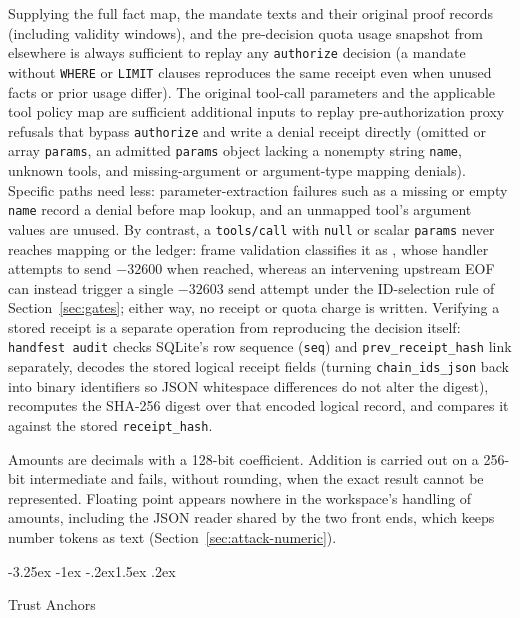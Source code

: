 \documentclass[10pt,twocolumn]{article}
\makeatletter
\theoremstyle{plain}
\theoremstyle{definition}
\renewcommand\subsection{\@startsection{subsection}{2}{\z@}%
  {-3.25ex \@plus -1ex \@minus -.2ex}{1.5ex \@plus .2ex}%
  {\normalfont\large\bfseries\raggedright}}
\makeatother
\begin{document}
Supplying the full fact map, the mandate texts and their original proof records (including validity windows), and the pre-decision quota usage snapshot from elsewhere is always sufficient to replay any \texttt{authorize} decision (a mandate without \texttt{WHERE} or \texttt{LIMIT} clauses reproduces the same receipt even when unused facts or prior usage differ). The original tool-call parameters and the applicable tool policy map are sufficient additional inputs to replay pre-authorization proxy refusals that bypass \texttt{authorize} and write a denial receipt directly (omitted or array \texttt{params}, an admitted \texttt{params} object lacking a nonempty string \texttt{name}, unknown tools, and missing-argument or argument-type mapping denials). Specific paths need less: parameter-extraction failures such as a missing or empty \texttt{name} record a denial before map lookup, and an unmapped tool's argument values are unused. By contrast, a \texttt{tools/call} with \texttt{null} or scalar \texttt{params} never reaches mapping or the ledger: frame validation classifies it as , whose handler attempts to send $-32600$ when reached, whereas an intervening upstream EOF can instead trigger a single $-32603$ send attempt under the ID-selection rule of Section~\ref{sec:gates}; either way, no receipt or quota charge is written. Verifying a stored receipt is a separate operation from reproducing the decision itself: \texttt{handfest audit} checks SQLite's row sequence (\texttt{seq}) and \texttt{prev\_receipt\_hash} link separately, decodes the stored logical receipt fields (turning \texttt{chain\_ids\_json} back into binary identifiers so JSON whitespace differences do not alter the digest), recomputes the SHA-256 digest over that encoded logical record, and compares it against the stored \texttt{receipt\_hash}.

Amounts are decimals with a 128-bit coefficient. Addition is carried out on a 256-bit intermediate and fails, without rounding, when the exact result cannot be represented. Floating point appears nowhere in the workspace's handling of amounts, including the JSON reader shared by the two front ends, which keeps number tokens as text (Section~\ref{sec:attack-numeric}).

\subsection{Trust Anchors}
\label{sec:anchors}
\end{document}

